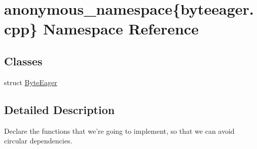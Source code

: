 \hypertarget{namespaceanonymous__namespace_02byteeager_8cpp_03}{\section{anonymous\-\_\-namespace\{byteeager.\-cpp\} Namespace Reference}
\label{namespaceanonymous__namespace_02byteeager_8cpp_03}
}
\subsection*{Classes}
\begin{DoxyCompactItemize}
\item 
struct \hyperlink{structanonymous__namespace_02byteeager_8cpp_03_1_1ByteEager}{Byte\-Eager}
\end{DoxyCompactItemize}


\subsection{Detailed Description}
Declare the functions that we're going to implement, so that we can avoid circular dependencies. 